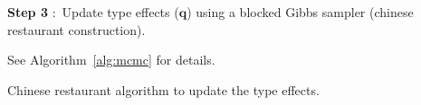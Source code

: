 \begin{algorithm}
\begin{algorithmic}
\bigskip{}
\State \parbox[t]{\dimexpr\linewidth-\algorithmicindent\relax}{%
    \setlength{\hangindent}{\algorithmicindent}%
      \textbf{Step 3} $\colon$ Update type effects ($\mathbf{q}$) using a blocked Gibbs sampler (chinese restaurant construction).}\strut
\State See Algorithm~\ref{alg:mcmc} for details.
\bigskip{}
\EndFor
\bigskip{}
\end{algorithmic}
\caption{Chinese restaurant algorithm to update the type effects.}
\label{alg:mcmc_full}
\end{algorithm}